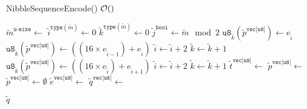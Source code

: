 \documentclass[../alan-handbook.tex]{subfiles}
\begin{document}
\begin{algorithm}
\caption{NibbleSequenceEncode() \hfill $\mathcal{O}()$  }
\label{Alg:NibbleSequenceEncode}
\begin{algorithmic}[1]
    \State $\tilde{m}^{\texttt{u-size}} \gets$  \Comment{\ref{NumElements}}
            \State $\tilde{i}^{\texttt{type}(\tilde{m})} \gets 0$
            \State $\tilde{k}^{\texttt{type}(\tilde{m})} \gets 0$
            \State $\tilde{j}^{\texttt{bool}} \gets \tilde{m} \mod 2$
        \EndConcurrency
                    \State $\texttt{u8}_{\tilde{k}}(\tilde{p}^{\texttt{vec[u8]}}) \gets e_{\tilde{i}}$
                \Else 
                    \State $\texttt{u8}_{\tilde{k}}(\tilde{p}^{\texttt{vec[u8]}}) \gets ((16 \times e_{\tilde{i}-1}) + e_{\tilde{i}}) $
                \EndIf
                    \State $\tilde{i} \gets \tilde{i} + 2$
                    \State $\tilde{k} \gets \tilde{k} + 1$
                \EndConcurrency
            \EndWhile
        \Else
                \State $\texttt{u8}_{\tilde{k}}(\tilde{p}^{\texttt{vec[u8]}}) \gets ((16 \times e_{\tilde{i}}) + e_{\tilde{i}+1}) $
                    \State $\tilde{i} \gets \tilde{i} + 2$
                    \State $\tilde{k} \gets \tilde{k} + 1$
                \EndConcurrency
            \EndWhile
        \EndIf
        \State $\tilde{t}^{\texttt{vec[u8]}} \gets$  \Comment{\ref{BoolEncode}}
        \State $\tilde{p}^{\texttt{vec[u8]}} \gets$  \Comment{\ref{ConcatByteArrays}}
    \Else 
        \State $\tilde{p}^{\texttt{vec[u8]}} \gets \emptyset$
    \EndIf 
    \State $\tilde{e}^{\texttt{vec[u8]}} \gets$  \Comment{\ref{LengthEncode}}
    \State $\tilde{q}^{\texttt{vec[u8]}} \gets$  \Comment{\ref{ConcatByteArrays}}    

    \Return $\tilde{q}$
\EndFunction
\end{algorithmic}
\end{algorithm}

\end{document}
